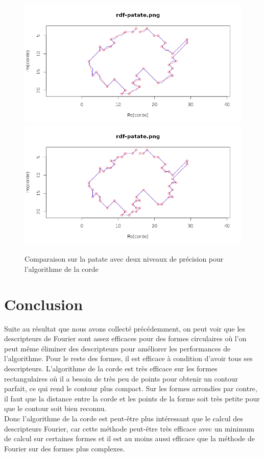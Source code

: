 \documentclass[11pt]{article}
\begin{document}
  \begin{center}
    \begin{figure}[!h]
      \includegraphics[width=14cm]{../resultat/comp_patate_impreci.png}
      \includegraphics[width=14cm]{../resultat/comp_patate_preci.png}
      \caption{Comparaison sur la patate avec deux niveaux de précision pour l'algorithme de la corde}
    \end{figure}
  \end{center}
  
  \newpage
    
  \section{Conclusion}
  Suite au résultat que nous avons collecté précédemment, on peut voir que les descripteurs de Fourier sont assez 
  efficaces pour des formes circulaires où l'on peut même éliminer des descripteurs pour améliorer les performances 
  de l'algorithme. Pour le reste des formes, il est efficace à condition d'avoir tous ses descripteurs. L'algorithme 
  de la corde est très efficace sur les formes rectangulaires où il a besoin de très peu de points pour obtenir un 
  contour parfait, ce qui rend le contour plus compact. Sur les formes arrondies par contre, il faut que la distance 
  entre la corde et les points de la forme soit très petite pour que le contour soit bien reconnu.\\
  
  Donc l'algorithme de la corde est peut-être plus intéressant que le calcul des descripteurs Fourier, car cette méthode 
  peut-être très efficace avec un minimum de calcul sur certaines formes et il est au moins aussi efficace que la méthode 
  de Fourier sur des formes plus complexes.
  
\end{document}
